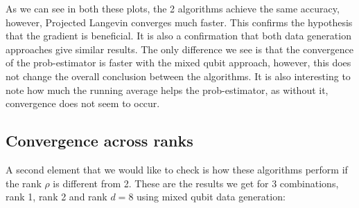 \documentclass[12pt]{memoir}
\begin{document}
As we can see in both these plots, the 2 algorithms achieve the same accuracy, however, Projected Langevin converges much faster. This confirms the hypothesis that the gradient is beneficial. It is also a confirmation that both data generation approaches give similar results. The only difference we see is that the convergence of the prob-estimator is faster with the mixed qubit approach, however, this does not change the overall conclusion between the algorithms. It is also interesting to note how much the running average helps the prob-estimator, as without it, convergence does not seem to occur.

\subsection*{Convergence across ranks}

A second element that we would like to check is how these algorithms perform if the rank $\rho$ is different from 2. These are the results we get for 3 combinations, rank 1, rank 2 and rank $d=8$ using mixed qubit data generation:
\end{document}
